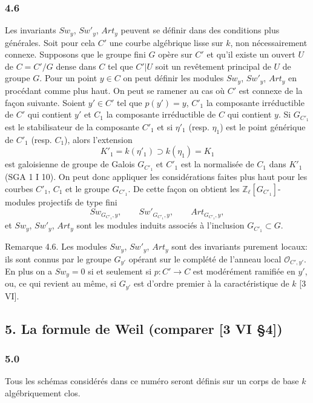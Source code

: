 \documentclass[11pt]{article}
\begin{document}
\subsubsection*{4.6}

Les invariants $Sw_y$, $Sw'_y$, $Art_y$ peuvent se définir dans des conditions plus générales. Soit pour cela $C'$ une courbe algébrique lisse sur $k$, non nécessairement connexe. Supposons que le groupe fini $G$ opère sur $C'$ et qu'il existe un ouvert $U$ de $C=C'/G$ dense dans $C$ tel que $C'|U$ soit un revêtement principal de $U$ de groupe $G$. Pour un point $y\in C$ on peut définir les modules $Sw_y$, $Sw'_y$, $Art_y$ en procédant comme plus haut. On peut se ramener au cas où $C'$ est connexe de la façon suivante. Soient $y'\in C'$ tel que $p(y')=y$, $C'_1$ la composante irréductible de $C'$ qui contient $y'$ et $C_1$ la composante irréductible de $C$ qui contient $y$. Si $G_{C'_1}$ est le stabilisateur de la composante $C'_1$ et si $\eta'_1$ (resp. $\eta_1$) est le point générique de $C'_1$ (resp. $C_1$), alors l'extension
\[
K'_1=k(\eta'_1)\supset k(\eta_1)=K_1
\]
est galoisienne de groupe de Galois $G_{C'_1}$ et $C'_1$ est la normalisée de $C_1$ dans $K'_1$ (SGA 1 I 10). On peut donc appliquer les considérations faites plus haut pour les courbes $C'_1$, $C_1$ et le groupe $G_{C'_1}$. De cette façon on obtient les $\mathbb Z_\ell[G_{C'_1}]$-modules projectifs de type fini
\[
Sw_{G_{C'_1},y},\qquad Sw'_{G_{C'_1},y},\qquad Art_{G_{C'_1},y},
\]
et $Sw_y$, $Sw'_y$, $Art_y$ sont les modules induits associés à l'inclusion $G_{C'_1}\subset G$.

Remarque 4.6. Les modules $Sw_y$, $Sw'_y$, $Art_y$ sont des invariants purement locaux: ils sont connus par le groupe $G_{y'}$ opérant sur le complété de l'anneau local $\mathcal O_{C',y'}$. En plus on a $Sw_y=0$ si et seulement si $p:C'\to C$ est modérément ramifiée en $y'$, ou, ce qui revient au même, si $G_{y'}$ est d'ordre premier à la caractéristique de $k$ [3 VI].

\subsection*{5. La formule de Weil (comparer [3 VI §4])}

\subsubsection*{5.0}

Tous les schémas considérés dans ce numéro seront définis sur un corps de base $k$ algébriquement clos.
\end{document}
